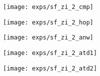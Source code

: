 \documentclass{USC-Thesis}
\numberwithin{equation}{chapter}
\begin{document}
\begin{figure*}[!ht]
	\begin{minipage}[b]{0.195\linewidth}
	\centering
		\texttt{[image: exps/sf\_zi\_2\_cmp]}
		\label{fig:sf_zi_2_cmp}
	\end{minipage}	
	\begin{minipage}[b]{0.195\linewidth}
	\centering
		\texttt{[image: exps/sf\_zi\_2\_hop]}
		\label{fig:sf_zi_2_hop}
	\end{minipage}
	\begin{minipage}[b]{0.195\linewidth}
	\centering
		\texttt{[image: exps/sf\_zi\_2\_anw]}
		\label{fig:sf_zi_2_anw}
	\end{minipage}
	\begin{minipage}[b]{0.195\linewidth}
		\centering
		\texttt{[image: exps/sf\_zi\_2\_atd1]}
		\label{fig:sf_zi_2_atd1}
	\end{minipage}
	\begin{minipage}[b]{0.195\linewidth}
	\centering
		\texttt{[image: exps/sf\_zi\_2\_atd2]}
		\label{fig:sf_zi_2_atd2}
	\end{minipage}
\begin{comment}	
	\begin{minipage}[b]{0.195\linewidth}
		\centering
		\texttt{[image: exps/ye\_li\_2\_cmp]}
		\subcaption{$\mathit{CMP}$, Ye.-Linear}
		\label{fig:ye_li_2_cmp}
	\end{minipage}
	\begin{minipage}[b]{0.195\linewidth}
	\centering
		\texttt{[image: exps/ye\_li\_2\_hop]}
		\subcaption{$\mathit{HOP}$, Ye.-Linear}
		\label{fig:ye_li_2_hop}
	\end{minipage}
	\begin{minipage}[b]{0.195\linewidth}
	\centering
		\texttt{[image: exps/ye\_li\_2\_anw]}
		\subcaption{$\mathit{ANW}$, Ye.-Linear}
		\label{fig:ye_li_2_anw}
	\end{minipage}
	\begin{minipage}[b]{0.195\linewidth}
	\centering
		\texttt{[image: exps/ye\_li\_2\_atd1]}
		\subcaption{$\mathit{WTD1}$, Ye.-Linear}
		\label{fig:ye_li_2_atd1}
	\end{minipage}
	\begin{minipage}[b]{0.195\linewidth}
	\centering
		\texttt{[image: exps/ye\_li\_2\_atd2]}
		\subcaption{$\mathit{WTD2}$, Ye.-Linear}
		\label{fig:ye_li_2_atd2}
	\end{minipage}


\end{comment}
\end{figure*}
\end{document}
